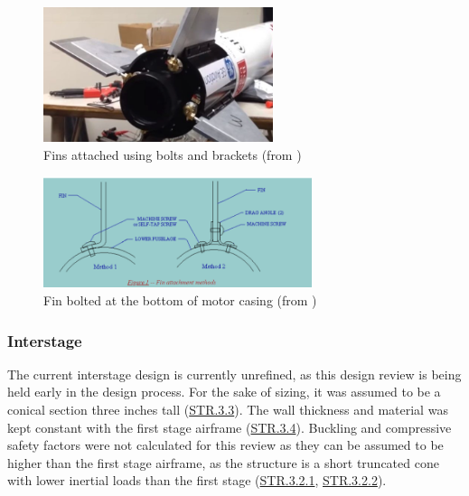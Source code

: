 \begin{figure}
    \centering
    \includegraphics[width=0.6\textwidth]{images/fin-example}
    \caption{Fins attached using bolts and brackets (from \cite{bu-astro})}
    \label{figure:bolts-and-brackets}
\end{figure}

\begin{figure}
    \centering
    \includegraphics[width=0.7\textwidth]{images/fin-attach-diagram}
    \caption{Fin bolted at the bottom of motor casing (from \cite{nakka})}
    \label{figure:fin-diagram}
\end{figure}


\subsubsection{Interstage}
The current interstage design is currently unrefined, as this design review is being held early in the design process. For the sake of sizing, it was assumed to be a conical section three inches tall (\hyperlink{STR.3.3}{STR.3.3}). The wall thickness and material was kept constant with the first stage airframe (\hyperlink{STR.3.4}{STR.3.4}). Buckling and compressive safety factors were not calculated for this review as they can be assumed to be higher than the first stage airframe, as the structure is a short truncated cone with lower inertial loads than the first stage (\hyperlink{STR.3.2.1}{STR.3.2.1}, \hyperlink{STR.3.2.2}{STR.3.2.2}).


